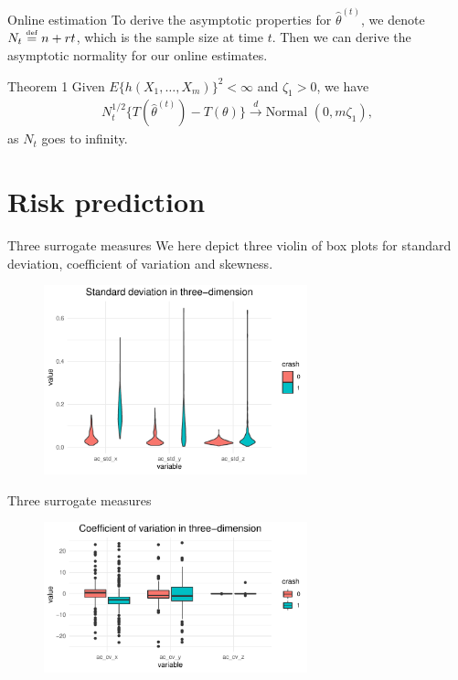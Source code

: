 \documentclass{beamer}
\def \bee {\begin{eqnarray*}}
\def \ene {\end{eqnarray*}}
\def\wh{\widehat}
\def\defby{\stackrel{\mbox{\textrm{\tiny def}}}{=}}
\def \bee {\begin{eqnarray*}}
\def \ene {\end{eqnarray*}}
\def\wh{\widehat}
\def\defby{\stackrel{\mbox{\textrm{\tiny def}}}{=}}
\begin{document}
{   \begin{frame}{Online estimation}
   	To derive the asymptotic properties for $\wh\theta^{(t)}$, we denote $N_t\defby n + rt$, which is the sample size at time $t$. Then we can derive the \alert{asymptotic normality} for our online estimates.
   	\begin{block}{Theorem 1}
   		Given $E\{h(X_{1},\ldots,X_{m})\}^2<\infty$ and $\zeta_1>0$, we have
   		\bee
   		N_t^{1/2}\{T(\wh\theta^{(t)}) - T(\theta) \} \stackrel{d}{\to}\text{Normal }(0, m\zeta_1),
   		\ene
   		as $N_t$ goes to infinity.
   	\end{block} 
   \end{frame}
   
   \section{Risk prediction}
   \begin{frame}{Three surrogate measures}
    We here depict three violin of box plots for \alert{standard deviation}, \alert{coefficient of variation} and \alert{skewness}.
    \begin{figure}[htbp]
    	\centering
        \includegraphics[width=3.0in]{figs/fig_std}
    	\label{fig_std}
    \end{figure}
   \end{frame}

   \begin{frame}{Three surrogate measures}
    	\begin{figure}[htbp]
    		\centering
    		\includegraphics[width=3.0in]{figs/fig_cv}
    		\label{fig_std}
    	\end{figure}
    \end{frame}

}
\end{document}
